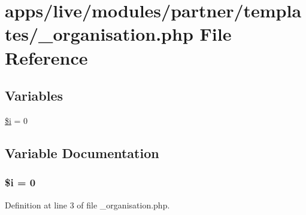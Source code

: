\hypertarget{__organisation_8php}{\section{apps/live/modules/partner/templates/\-\_\-organisation.php File Reference}
\label{__organisation_8php}
}
\subsection*{Variables}
\begin{DoxyCompactItemize}
\item 
\hyperlink{__organisation_8php_a83018d9153d17d91fbcf3bc10158d34f}{\$i} = 0
\end{DoxyCompactItemize}


\subsection{Variable Documentation}
\hypertarget{__organisation_8php_a83018d9153d17d91fbcf3bc10158d34f}{
\subsubsection[{\$i}]{\setlength{\rightskip}{0pt plus 5cm}\${\bf i} = 0}}\label{__organisation_8php_a83018d9153d17d91fbcf3bc10158d34f}


Definition at line 3 of file \-\_\-organisation.\-php.


